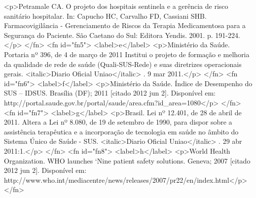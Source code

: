         <p>Petramale CA. O projeto dos hospitais sentinela e a gerência de risco sanitário
          hospitalar. In: Capucho HC, Carvalho FD, Cassiani SHB. Farmacovigilância - Gerenciamento
          de Riscos da Terapia Medicamentosa para a Segurança do Paciente. São Caetano do Sul:
          Editora Yendis. 2001. p. 191-224.</p>
      </fn>
      <fn id="fn5">
        <label>e</label>
        <p>Ministério da Saúde. Portaria nº 396, de 4 de março de 2011 Institui o projeto de
          formação e melhoria da qualidade de rede de saúde (Quali-SUS-Rede) e suas diretrizes
          operacionais gerais. <italic>Diario Oficial Uniao</italic> . 9 mar 2011.</p>
      </fn>
      <fn id="fn6">
        <label>f</label>
        <p>Ministério da Saúde. Índice de Desempenho do SUS – IDSUS. Brasília (DF); 2011 [citado
          2012 jun 2]. Disponível em:
          http://portal.saude.gov.br/portal/saude/area.cfm?id_area=1080</p>
      </fn>
      <fn id="fn7">
        <label>g</label>
        <p>Brasil. Lei nº 12.401, de 28 de abril de 2011. Altera a Lei nº 8.080, de 19 de setembro
          de 1990, para dispor sobre a assistência terapêutica e a incorporação de tecnologia em
          saúde no âmbito do Sistema Único de Saúde - SUS. <italic>Diario Oficial Uniao</italic> .
          29 abr 2011:1.</p>
      </fn>
      <fn id="fn8">
        <label>h</label>
        <p>World Health Organization. WHO launches ‘Nine patient safety solutions. Geneva; 2007
          [citado 2012 jun 2]. Disponível em:
          http://www.who.int/mediacentre/news/releases/2007/pr22/en/index.html</p>
      </fn>

